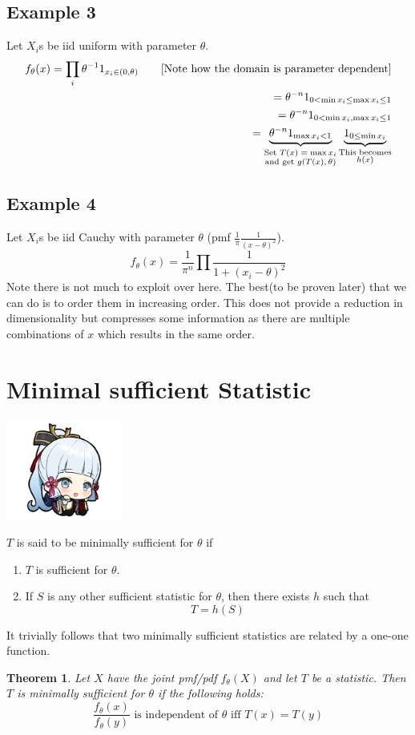 \documentclass[oneside]{book}
\newtheorem{theorem}{Theorem}
\begin{document}
\subsection{Example 3}
Let $X_i$s be iid uniform with parameter $\theta$.
\begin{align*}
    f_\theta(x)=\prod_{i}\theta^{-1}1_{x_i\in(0,\theta)}\tag*{\text{[Note how the domain is parameter dependent]}}\\
    =\theta^{-n}1_{0<\min x_i\leq \max x_i\leq 1}\\
    =\theta^{-n}1_{0<\min x_i,\max x_i\leq 1}\\
    =\underbrace{\theta^{-n}1_{\max x_i<1}}_
    {\substack{
        \text{Set $T(x)=\max x_i$}\\
        \text{and get $g(T(x),\theta)$}}}
   \underbrace{ 1_{0\leq \min x_i}}_
   {\substack{\text{This becomes}\\ h(x)}}
\end{align*}
\subsection{Example 4}
Let $X_i$s be iid Cauchy with parameter $\theta$ (pmf $\frac{1}{\pi}\frac{1}{(x-\theta)^2}$). 
$$f_\theta(x)=\frac{1}{\pi^n}\prod\frac{1}{1+(x_i-\theta)^2}$$
Note there is not much to exploit over here. The best(to be proven later) that we can do is to order them in increasing order. This does not provide a reduction in dimensionality but compresses some information as there are multiple combinations of $x$ which results in the same order. 
\section{Minimal sufficient Statistic}
\begin{marginfigure}%
    \includegraphics[width=1.5in]{chibis/file_020.png}
\end{marginfigure}%
$T$ is said to be minimally sufficient for $\theta$ if
\begin{enumerate}
    \item $T$ is sufficient for $\theta$.
    \item If $S$ is any other sufficient statistic for $\theta$, then there exists $h$ such that $$T=h(S)$$
\end{enumerate}
It trivially follows that two minimally sufficient statistics are related by a one-one function.
\begin{theorem}
    Let $X$ have the joint pmf/pdf $f_\theta(X)$ and let $T$ be a statistic. Then $T$ is minimally sufficient for $\theta$ if the following holds:
    $$\frac{f_\theta(x)}{f_\theta(y)}\text{ is independent of $\theta$ iff }T(x)=T(y)$$
\end{theorem}
\end{document}
